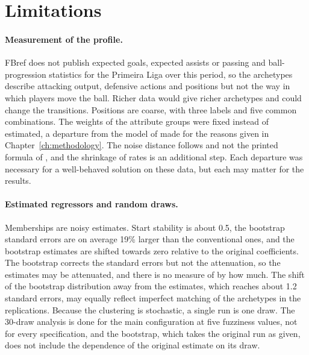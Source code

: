 \section{Limitations}
\label{sec:disc-limitations}

\paragraph{Measurement of the profile.} FBref does not publish expected goals, expected assists or passing and ball-progression statistics for the Primeira Liga over this period, so the archetypes describe attacking output, defensive actions and positions but not the way in which players move the ball. Richer data would give richer archetypes and could change the transitions. Positions are coarse, with three labels and five common combinations. The weights of the attribute groups were fixed instead of estimated, a departure from the model of  made for the reasons given in Chapter~\ref{ch:methodology}. The noise distance follows  and not the printed formula of , and the shrinkage of rates is an additional step. Each departure was necessary for a well-behaved solution on these data, but each may matter for the results.

\paragraph{Estimated regressors and random draws.} Memberships are noisy estimates. Start stability is about 0.5, the bootstrap standard errors are on average 19\% larger than the conventional ones, and the bootstrap estimates are shifted towards zero relative to the original coefficients. The bootstrap corrects the standard errors but not the attenuation, so the estimates may be attenuated, and there is no measure of by how much. The shift of the bootstrap distribution away from the estimates, which reaches about 1.2 standard errors, may equally reflect imperfect matching of the archetypes in the replications. Because the clustering is stochastic, a single run is one draw. The 30-draw analysis is done for the main configuration at five fuzziness values, not for every specification, and the bootstrap, which takes the original run as given, does not include the dependence of the original estimate on its draw.

